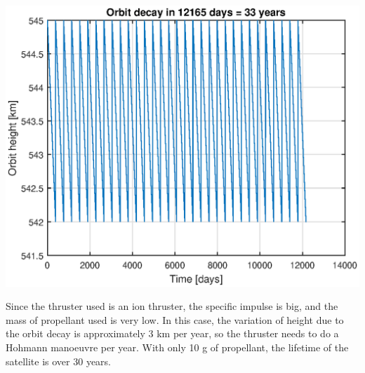 \begin{minipage}{\textwidth}
\begin{minipage}[b]{0.49\textwidth}
\centering
\includegraphics[scale=0.4]{ThrustersDrag/thrust3km.eps}
\label{fig:hohmann3km}
\end{minipage}
\hfill
{}
\end{minipage}

Since the thruster used is an ion thruster, the specific impulse is big, and the mass of propellant used is very low. In this case, the variation of height due to the orbit decay is approximately 3 km per year, so the thruster needs to do a Hohmann manoeuvre per year. With only 10 g of propellant, the lifetime of the satellite is over 30 years.

